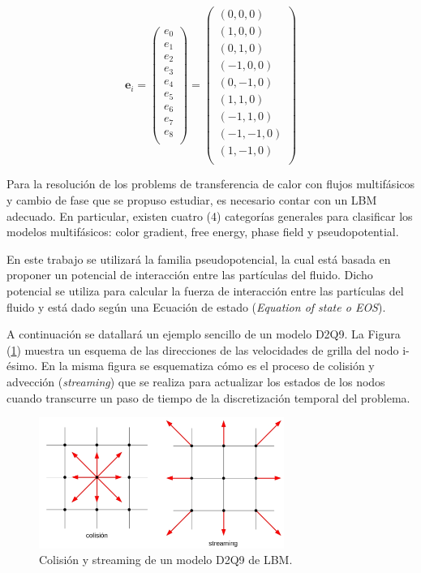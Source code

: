 \begin{equation}
{\mathbf{e}_{i}} =  
\left( \begin{array}{c} 
e_{0} \\ e_{1}\\ e_{2}\\ e_{3}\\ e_{4}\\ e_{5}\\
e_{6}\\ e_{7}\\ e_{8}\\
\end{array}
\right) =
\left( \begin{array}{c} 
( 0, 0, 0) \\ ( 1, 0, 0) \\ ( 0, 1, 0) \\(-1, 0, 0) \\ ( 0,-1, 0) \\ ( 1, 1, 0) \\
(-1, 1, 0) \\ (-1,-1, 0) \\ ( 1,-1, 0)\\ 
\end{array}
\right) 
\label{eq:velgrilla}
\end{equation}

Para la resolución de los problems de transferencia de calor con flujos multifásicos y cambio de fase que se propuso estudiar, es necesario contar con un LBM adecuado. En particular, existen cuatro (4) categorías generales para clasificar los modelos multifásicos: color gradient, free energy, phase field y pseudopotential.

En este trabajo se utilizará la familia pseudopotencial, la cual está basada en proponer un potencial de interacción entre las partículas del fluido. Dicho potencial se utiliza para calcular la fuerza de interacción entre las partículas del fluido y está dado según una Ecuación de estado (\textit{Equation of state o EOS}). 

A continuación se datallará un ejemplo sencillo de un modelo D2Q9. La Figura (\ref{fig:grilla_D2Q9}) muestra un esquema de las direcciones de las velocidades de grilla del nodo i-ésimo. En la misma figura se esquematiza cómo  es el proceso de colisión y advección (\textit{streaming}) que se realiza para actualizar los estados de los nodos cuando transcurre un paso de tiempo de la discretización temporal del problema. 


\begin{figure}[h!]
	\centering
	\includegraphics[width=8cm]{grilla_stre_colli_intro.png}
	\caption{Colisión y streaming de un modelo D2Q9 de LBM.}
	\label{fig:grilla_D2Q9}
\end{figure}

